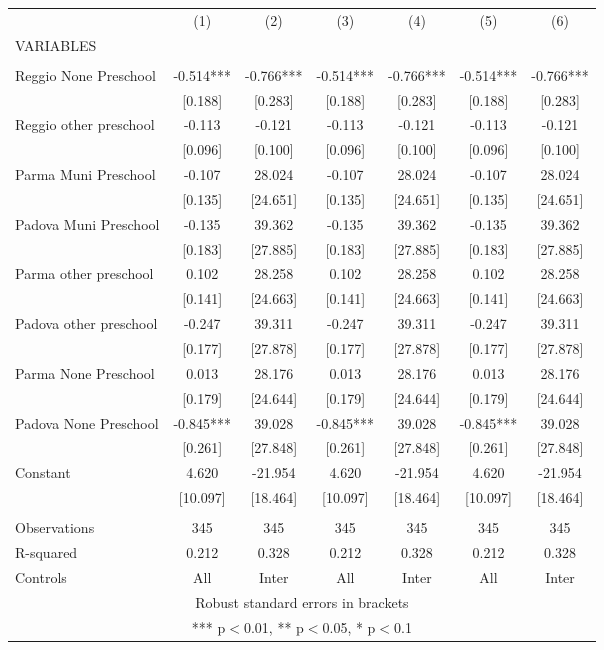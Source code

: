 \begin{tabular}{lcccccc} \hline
 & (1) & (2) & (3) & (4) & (5) & (6) \\
VARIABLES &  &  &  &  &  &  \\ \hline
 &  &  &  &  &  &  \\
Reggio None Preschool & -0.514*** & -0.766*** & -0.514*** & -0.766*** & -0.514*** & -0.766*** \\
 & [0.188] & [0.283] & [0.188] & [0.283] & [0.188] & [0.283] \\
Reggio other preschool & -0.113 & -0.121 & -0.113 & -0.121 & -0.113 & -0.121 \\
 & [0.096] & [0.100] & [0.096] & [0.100] & [0.096] & [0.100] \\
Parma Muni Preschool & -0.107 & 28.024 & -0.107 & 28.024 & -0.107 & 28.024 \\
 & [0.135] & [24.651] & [0.135] & [24.651] & [0.135] & [24.651] \\
Padova Muni Preschool & -0.135 & 39.362 & -0.135 & 39.362 & -0.135 & 39.362 \\
 & [0.183] & [27.885] & [0.183] & [27.885] & [0.183] & [27.885] \\
Parma other preschool & 0.102 & 28.258 & 0.102 & 28.258 & 0.102 & 28.258 \\
 & [0.141] & [24.663] & [0.141] & [24.663] & [0.141] & [24.663] \\
Padova other preschool & -0.247 & 39.311 & -0.247 & 39.311 & -0.247 & 39.311 \\
 & [0.177] & [27.878] & [0.177] & [27.878] & [0.177] & [27.878] \\
Parma None Preschool & 0.013 & 28.176 & 0.013 & 28.176 & 0.013 & 28.176 \\
 & [0.179] & [24.644] & [0.179] & [24.644] & [0.179] & [24.644] \\
Padova None Preschool & -0.845*** & 39.028 & -0.845*** & 39.028 & -0.845*** & 39.028 \\
 & [0.261] & [27.848] & [0.261] & [27.848] & [0.261] & [27.848] \\
Constant & 4.620 & -21.954 & 4.620 & -21.954 & 4.620 & -21.954 \\
 & [10.097] & [18.464] & [10.097] & [18.464] & [10.097] & [18.464] \\
 &  &  &  &  &  &  \\
Observations & 345 & 345 & 345 & 345 & 345 & 345 \\
R-squared & 0.212 & 0.328 & 0.212 & 0.328 & 0.212 & 0.328 \\
 Controls & All & Inter & All & Inter & All & Inter \\ \hline
\multicolumn{7}{c}{ Robust standard errors in brackets} \\
\multicolumn{7}{c}{ *** p$<$0.01, ** p$<$0.05, * p$<$0.1} \\
\end{tabular}

